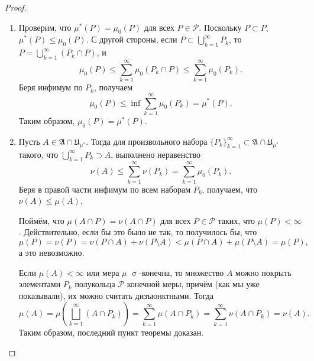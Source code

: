 \documentclass[a4paper]{article}
\theoremstyle{indented}
\theoremstyle{definition}
\theoremstyle{remark}
\DeclareMathOperator{\s}{\sigma}
\begin{document}
\begin{proof}
\begin{enumerate}
		\item Проверим, что $ \mu^*(P)=\mu_0(P) $ для всех $  P\in\mathcal{P} $. Поскольку $ P\subset P $, $ \mu^*(P)\le \mu_0(P) $. С другой стороны, если $  P\subset\bigcup_{k=1}^{\infty}{P_k} $, то $  P=\bigcup_{k=1}^{\infty}{(P_k\cap P)} $, и
		\begin{equation*}
			\mu_0(P)\le\sum_{k=1}^{\infty}\mu_0(P_k\cap P)\le \sum_{k=1}^{\infty}\mu_0(P_k).
		\end{equation*}
		Беря инфимум по $ P_k $, получаем 
		\begin{equation*}
			\mu_0(P)\le \inf{\sum_{k=1}^{\infty}\mu_0(P_k)}=\mu^*(P). 
		\end{equation*}
		Таким образом, $ \mu_0(P)=\mu^*(P) $.
		\item Пусть $ A\in \mathfrak{A}\cap \mathfrak{U}_{\mu^*} $. Тогда для произвольного набора $ \{P_k\}_{k=1}^\infty\subset \mathfrak{A}\cap \mathfrak{U}_{\mu^*} $ такого, что $ \bigcup_{k=1}^{\infty}P_k \supset A $, выполнено неравенство 
		\begin{equation*}
			\nu(A)\le\sum_{k=1}^{\infty}\nu(P_k)=\sum_{k=1}^{\infty}\mu_0(P_k). 
		\end{equation*}
		Беря в правой части инфимум по всем наборам $ P_k $, получаем, что $ \nu(A)\le\mu(A) $. 
		
		Поймём, что
		$ \mu(A\cap P)=\nu(A\cap P) $ для всех $ P\in\mathcal{P} $ таких, что $ \mu(P)<\infty $. Действительно, если бы это было не так, то получилось бы, что
		\begin{equation*}
			\mu(P)=\nu(P)=\nu(P\cap A)+\nu(P\setminus A)<\mu(P\cap A)+\mu(P\setminus A)=\mu(P),
		\end{equation*}
		а это невозможно.
		
		Если $ \mu(A)<\infty $ или мера $ \mu $ $ \s $-конечна, то множество $ A $ можно покрыть элементами $ P_k $ полукольца $ \mathcal{P} $ конечной меры, причём (как мы уже показывали), их можно считать дизъюнктными. Тогда
		\begin{equation*}
			\mu(A)=\mu\left(\bigsqcup_{k=1}^\infty(A\cap P_k)\right)=\sum_{k=1}^\infty\mu(A\cap P_k)=\sum_{k=1}^\infty\nu(A\cap P_k)=\nu(A).
		\end{equation*}
		Таким образом, последний пункт теоремы доказан. \qedhere
	\end{enumerate}
\end{proof}
\end{document}
